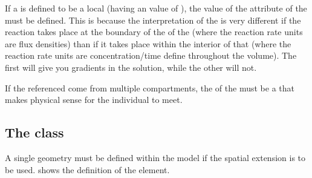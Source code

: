 If a \Reaction is defined to be a local (having an  value of ), the value of the  attribute of the \Reaction must be defined.  This is because the interpretation of the \Reaction is very different if the reaction takes place at the boundary of the \Compartment of the \Species (where the reaction rate units are flux densities) than if it takes place within the interior of that \Compartment (where the reaction rate units are concentration/time define throughout the volume).  The first will give you gradients in the solution, while the other will not.

If the referenced \Species come from multiple compartments, the  of the \Reaction must be a \Compartment that makes physical sense for the individual \Species to meet.

\subsection{The  class}
\label{geometry-class}
\label{listofcoordinatecomponents-class}
\label{listofdomaintypes-class}
\label{listofdomains-class}
\label{listofadjacentdomains-class}
\label{listofgeometrydefinitions-class}
\label{listofsampledfields-class}

A single geometry must be defined within the model if the spatial extension is to be used.  shows the definition of the \Geometry element.
 
